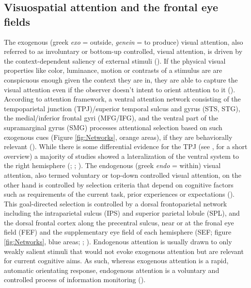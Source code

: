 \documentclass[a4paper, 12pt]{scrreprt}
\begin{document}
\subsection{Visuospatial attention and the frontal eye fields}\label{section:visualattention}
The exogenous (greek \textit{exo} = outside, \textit{genein} = to produce) visual attention, also referred to as involuntary or bottom-up controlled, visual attention, is driven by the context-dependent saliency of external stimuli (\cite{itti2001computational}). If the physical visual properties like color, luminance, motion or contrasts of a stimulus are are conspicuous enough given the context they are in, they are able to capture the visual attention even if the observer doesn’t intent to orient attention to it (\cite{chica2013two}). According to \textcite{corbetta2002control} attention framework, a ventral attention network consisting of the tempoparietal junction (TPJ)/superior temporal sulcus and gyrus (STS, STG), the medial/inferior frontal gyri (MFG/IFG), and the ventral part of the supramarginal gyrus (SMG) processes attentional selection based on such exogenous cues (Figure \ref{fig:Networks}, orange areas), if they are behaviorally relevant (\cite{downar2000multimodal}). While there is some differential evidence for the TPJ (see \textcite{vossel2014dorsal}, for a short overview) a majority of studies showed a lateralization of the ventral system to the right hemisphere (\cite{corbetta2002control}; \cite{fox2006spontaneous}; \cite{corbetta2008reorienting}). \newline 
The endogenous (greek \textit{endo} = within) visual attention, also termed voluntary or top-down controlled visual attention, on the other hand is controlled by selection criteria that depend on cognitive factors such as requirements of the current task, prior experiences or expectations (\cite{itti2001computational}). This goal-directed selection is controlled by a dorsal frontoparietal network including the intraparietal sulcus (IPS) and superior parietal lobule (SPL), and the dorsal frontal cortex along the precentral sulcus, near or at the fronal eye field (FEF) and the supplementary eye field of each hemisphere (SEF; figure \ref{fig:Networks}, blue areas; \cite{corbetta2002control}; \cite{corbetta2008reorienting}). Endogenous attention is usually drawn to only weakly salient stimuli that would not evoke exogenous attention but are relevant for current cognitive aims. As such, whereas exogenous attention is a rapid, automatic orientating response, endogenous attention is a voluntary and controlled process of information monitoring (\cite{carrasco2011visual}).
\end{document}
